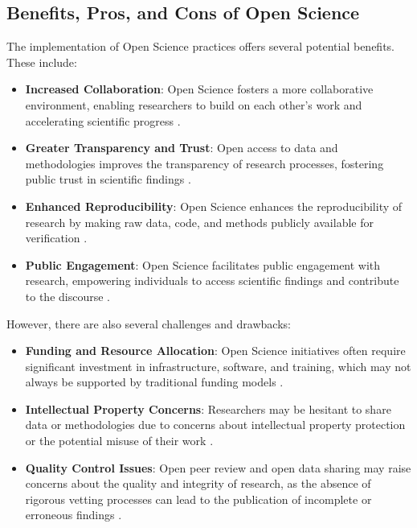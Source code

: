 \documentclass{article}
\begin{document}
\subsection{Benefits, Pros, and Cons of Open Science}
The implementation of Open Science practices offers several potential benefits. These include:
\begin{itemize}
    \item \textbf{Increased Collaboration}: Open Science fosters a more collaborative environment, enabling researchers to build on each other's work and accelerating scientific progress \cite{Borgman2012}.
    \item \textbf{Greater Transparency and Trust}: Open access to data and methodologies improves the transparency of research processes, fostering public trust in scientific findings \cite{Boulton2015}.
    \item \textbf{Enhanced Reproducibility}: Open Science enhances the reproducibility of research by making raw data, code, and methods publicly available for verification \cite{Nosek2015}.
    \item \textbf{Public Engagement}: Open Science facilitates public engagement with research, empowering individuals to access scientific findings and contribute to the discourse \cite{Leonelli2016}.
\end{itemize}

However, there are also several challenges and drawbacks:
\begin{itemize}
    \item \textbf{Funding and Resource Allocation}: Open Science initiatives often require significant investment in infrastructure, software, and training, which may not always be supported by traditional funding models \cite{Borgman2012}.
    \item \textbf{Intellectual Property Concerns}: Researchers may be hesitant to share data or methodologies due to concerns about intellectual property protection or the potential misuse of their work \cite{Boulton2015}.
    \item \textbf{Quality Control Issues}: Open peer review and open data sharing may raise concerns about the quality and integrity of research, as the absence of rigorous vetting processes can lead to the publication of incomplete or erroneous findings \cite{Piwowar2011}.
\end{itemize}
\end{document}
